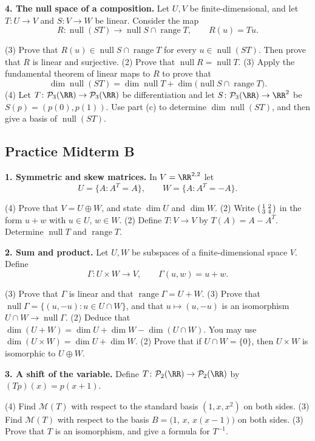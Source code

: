 \documentclass[11pt]{scrartcl}
\DeclareMathOperator{\nul}{null}
\DeclareMathOperator{\range}{range}
\newcommand{\PP}{\mathcal P}
\newcommand{\MM}{\mathcal M}
\begin{document}
\medskip\noindent\textbf{4. The null space of a composition.} Let $U,V$ be finite-dimensional, and let $T\colon U\to V$ and $S\colon V\to W$ be linear. Consider the map
\[ R\colon\nul(ST)\longrightarrow\nul S\cap\range T,\qquad R(u)=Tu. \]
\begin{enumerate}[a)]
  \ii (3) Prove that $R(u)\in\nul S\cap\range T$ for every $u\in\nul(ST)$. Then prove that $R$ is linear and surjective.
  \ii (2) Prove that $\nul R=\nul T$.
  \ii (3) Apply the fundamental theorem of linear maps to $R$ to prove that
  \[ \dim\nul(ST)=\dim\nul T+\dim\big(\nul S\cap\range T\big). \]
  \ii (4) Let $T\colon\PP_3(\RR)\to\PP_3(\RR)$ be differentiation and let $S\colon\PP_3(\RR)\to\RR^2$ be $S(p)=(p(0),p(1))$. Use part (c) to determine $\dim\nul(ST)$, and then give a basis of $\nul(ST)$.
\end{enumerate}

\endgroup
\clearpage\begingroup\subsection{Practice Midterm B}

\medskip\noindent\textbf{1. Symmetric and skew matrices.} In $V=\RR^{2,2}$ let
\[ U=\{A:A^T=A\},\qquad W=\{A:A^T=-A\}. \]
\begin{enumerate}[a)]
  \ii (4) Prove that $V=U\oplus W$, and state $\dim U$ and $\dim W$.
  \ii (2) Write $\begin{psmallmatrix}1&2\\3&4\end{psmallmatrix}$ in the form $u+w$ with $u\in U$, $w\in W$.
  \ii (2) Define $T\colon V\to V$ by $T(A)=A-A^T$. Determine $\nul T$ and $\range T$.
\end{enumerate}

\medskip\noindent\textbf{2. Sum and product.} Let $U,W$ be subspaces of a finite-dimensional space $V$. Define
\[ \Gamma\colon U\times W\longrightarrow V,\qquad \Gamma(u,w)=u+w. \]
\begin{enumerate}[a)]
  \ii (3) Prove that $\Gamma$ is linear and that $\range\Gamma=U+W$.
  \ii (3) Prove that $\nul\Gamma=\{(u,-u):u\in U\cap W\}$, and that $u\mapsto(u,-u)$ is an isomorphism $U\cap W\to\nul\Gamma$.
  \ii (2) Deduce that $\dim(U+W)=\dim U+\dim W-\dim(U\cap W)$. You may use $\dim(U\times W)=\dim U+\dim W$.
  \ii (2) Prove that if $U\cap W=\{0\}$, then $U\times W$ is isomorphic to $U\oplus W$.
\end{enumerate}

\medskip\noindent\textbf{3. A shift of the variable.} Define $T\colon\PP_2(\RR)\to\PP_2(\RR)$ by $(Tp)(x)=p(x+1)$.
\begin{enumerate}[a)]
  \ii (4) Find $\MM(T)$ with respect to the standard basis $(1,x,x^2)$ on both sides.
  \ii (3) Find $\MM(T)$ with respect to the basis $B=\big(1,\,x,\,x(x-1)\big)$ on both sides.
  \ii (3) Prove that $T$ is an isomorphism, and give a formula for $T^{-1}$.
\end{enumerate}
\end{document}
